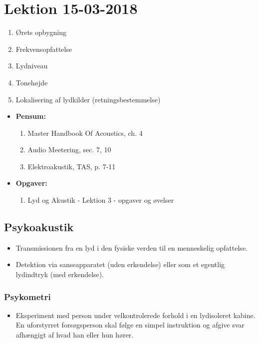 \section{Lektion 15-03-2018}

\begin{enumerate}
	\item Ørets opbygning
	\item Frekvensopfattelse
	\item Lydniveau
	\item Tonehøjde
	\item Lokalisering af lydkilder (retningsbestemmelse)
\end{enumerate}

\begin{mdframed}[style=exampledefault]
	\begin{itemize}
		\item \textbf{Pensum:} 
		\begin{enumerate}
			\item Master Handbook Of Acoustics, ch. 4
			\item Audio Meetering, sec. 7, 10
			\item Elektroakustik, TAS,  p. 7-11
		\end{enumerate}
		\item \textbf{Opgaver:} 
		\begin{enumerate}
			\item Lyd og Akustik - Lektion 3 - opgaver og øvelser
		\end{enumerate}
	\end{itemize}
\end{mdframed}

\subsection{Psykoakustik}
\begin{itemize}
	\item Transmissionen fra en lyd i den fysiske verden til en menneskelig opfattelse.
	\item Detektion via sanseapparatet (uden erkendelse) eller som et
	egentlig lydindtryk (med erkendelse).
\end{itemize}

\subsubsection{Psykometri}
\begin{itemize}
	\item Eksperiment med person under velkontrolerede forhold i en lydisoleret kabine. En uforstyrret forsøgsperson skal følge en simpel instruktion og afgive svar afhængigt af hvad	han eller hun hører. 
\end{itemize}

